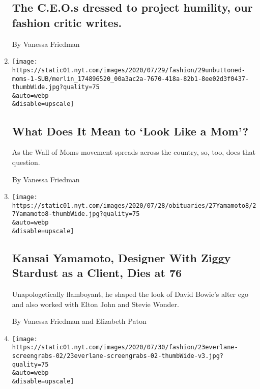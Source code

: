 \begin{enumerate}
  \hypertarget{the-ceos-dressed-to-project-humility-our-fashion-critic-writes}{%
  \subsection{The C.E.O.s dressed to project humility, our fashion
  critic
  writes.}\label{the-ceos-dressed-to-project-humility-our-fashion-critic-writes}}

  By Vanessa Friedman
\item
  \href{/2020/07/28/style/wall-of-moms-image.html}{}

  \texttt{[image: https://static01.nyt.com/images/2020/07/29/fashion/29unbuttoned-moms-1-SUB/merlin\_174896520\_00a3ac2a-7670-418a-82b1-8ee02d3f0437-thumbWide.jpg?quality=75\\\&auto=webp\\\&disable=upscale]}

  \hypertarget{what-does-it-mean-to-look-like-a-mom}{%
  \subsection{What Does It Mean to `Look Like a
  Mom'?}\label{what-does-it-mean-to-look-like-a-mom}}

  As the Wall of Moms movement spreads across the country, so, too, does
  that question.

  By Vanessa Friedman
\item
  \href{/2020/07/27/fashion/kansai-yamamoto-david-bowie-japanese-fashion-designer-dies.html}{}

  \texttt{[image: https://static01.nyt.com/images/2020/07/28/obituaries/27Yamamoto8/27Yamamoto8-thumbWide.jpg?quality=75\\\&auto=webp\\\&disable=upscale]}

  \hypertarget{kansai-yamamoto-designer-with-ziggy-stardust-as-a-client-dies-at-76}{%
  \subsection{Kansai Yamamoto, Designer With Ziggy Stardust as a Client,
  Dies at
  76}\label{kansai-yamamoto-designer-with-ziggy-stardust-as-a-client-dies-at-76}}

  Unapologetically flamboyant, he shaped the look of David Bowie's alter
  ego and also worked with Elton John and Stevie Wonder.

  By Vanessa Friedman and Elizabeth Paton
\item
  \href{/2020/07/26/fashion/everlane-employees-ethical-clothing.html}{}

  \texttt{[image: https://static01.nyt.com/images/2020/07/30/fashion/23everlane-screengrabs-02/23everlane-screengrabs-02-thumbWide-v3.jpg?quality=75\\\&auto=webp\\\&disable=upscale]}


\end{enumerate}
